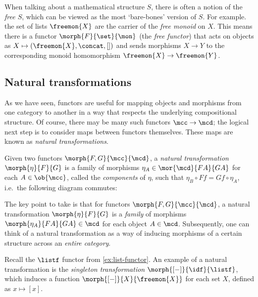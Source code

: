 \begin{example}\label{ex:free-monoid}
    When talking about a mathematical structure \(S\), there is often a notion
    of the \emph{free \(S\)}, which can be viewed as the most `bare-bones'
    version of \(S\).
    For example. the set of lists \(\freemon{X}\) are the carrier of the
    \emph{free monoid} on \(X\).
    This means there is a functor \(\morph{F}{\set}{\mon}\) (the
    \emph{free functor}) that acts on objects as \(
        X \mapsto (\freemon{X}, \concat, [])
    \) and sends morphisms \(X \to Y\) to the corresponding monoid homomorphism
    \(\freemon{X} \to \freemon{Y}\).
\end{example}

\subsection{Natural transformations}

As we have seen, functors are useful for mapping objects and morphisms from one
category to another in a way that respects the underlying compositional
structure.
Of course, there may be many such functors \(\mcc \to \mcd\); the logical next
step is to consider maps between functors themselves.
These maps are known as \emph{natural transformations}.

\begin{definition}
    Given two functors \(\morph{F, G}{\mcc}{\mcd}\), a
    \emph{natural transformation} \(\morph{\eta}{F}{G}\) is a family of
    morphisms \(
        \eta_A \in \mor{\mcd}{FA}{GA}
    \) for each \(A \in \ob{\mcc}\), called the \emph{components} of \(\eta\),
    such that \(
        \eta_B \circ Ff = Gf \circ \eta_A
    \), i.e.\ the following diagram commutes:
    \begin{center}
        
    \end{center}
\end{definition}

The key point to take is that for functors \(\morph{F,G}{\mcc}{\mcd}\), a
natural transformation \(\morph{\eta}{F}{G}\) is a \emph{family} of morphisms
\(\morph{\eta_A}{FA}{GA} \in \mcd\) for each object \(A \in \mcd\).
Subsequently, one can think of a natural transformation as a way of inducing
morphisms of a certain structure across an \emph{entire category}.

\begin{example}[Singleton]
    Recall the \(\listf\) functor from \cref{ex:list-functor}.
    An example of a natural transformation is the
    \emph{singleton transformation} \(\morph{[-]}{\idf}{\listf}\), which
    induces a function \(\morph{[-]}{X}{\freemon{X}}\) for each set \(X\),
    defined as \(x \mapsto [x]\).
\end{example}

